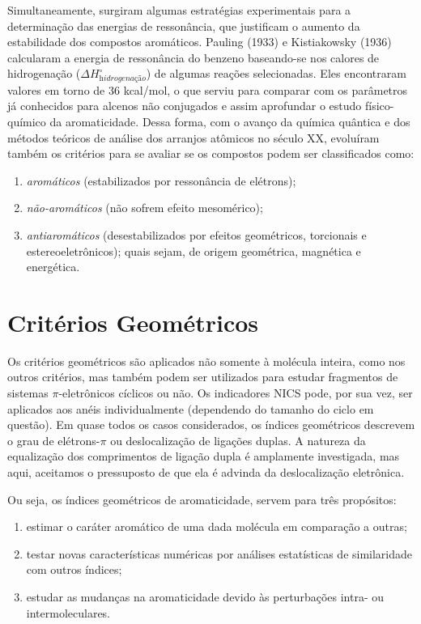 Simultaneamente, surgiram algumas estratégias experimentais para a determinação das energias de ressonância, que justificam o aumento da estabilidade dos compostos aromáticos. Pauling (1933) \autocite{Pauling1933, Pauling1936} e Kistiakowsky (1936) calcularam a energia de ressonância do benzeno baseando-se nos calores de hidrogenação ($\Delta H^{\circ}_{\textit{hidrogenação}}$) de algumas reações selecionadas. Eles encontraram valores em torno de 36 kcal/mol, o que serviu para comparar com os parâmetros já conhecidos para alcenos não conjugados e assim aprofundar o estudo físico-químico da aromaticidade. Dessa forma, com o avanço da química quântica e dos métodos teóricos de análise dos arranjos atômicos no século XX, evoluíram também os critérios para se avaliar se os compostos podem ser classificados como:

\begin{enumerate}
    \item \textit{aromáticos} (estabilizados por ressonância de elétrons);
    \item \textit{não-aromáticos} (não sofrem efeito mesomérico);
    \item \textit{antiaromáticos} (desestabilizados por efeitos geométricos, torcionais e estereoeletrônicos); quais sejam, de origem geométrica, magnética e energética. 
\end{enumerate}

\section{Critérios Geométricos}

Os critérios geométricos são aplicados não somente à molécula inteira, como nos outros critérios, mas também podem ser utilizados para estudar fragmentos de sistemas $\pi$-eletrônicos cíclicos ou não. Os indicadores NICS pode, por sua vez, ser aplicados aos anéis individualmente (dependendo do tamanho do ciclo em questão). Em quase todos os casos considerados, os índices geométricos descrevem o grau de elétrons-$\pi$ ou deslocalização de ligações duplas. A natureza da equalização dos comprimentos de ligação dupla é amplamente investigada, mas aqui, aceitamos o pressuposto de que ela é advinda da deslocalização eletrônica.

Ou seja, os índices geométricos de aromaticidade, servem para três propósitos:

\begin{enumerate}
    \item estimar o caráter aromático de uma dada molécula em comparação a outras;
    \item testar novas características numéricas por análises estatísticas de similaridade com outros índices;
    \item estudar as mudanças na aromaticidade devido às perturbações intra- ou intermoleculares.
\end{enumerate}

